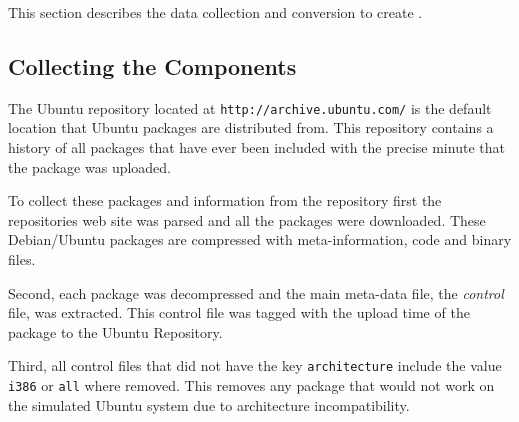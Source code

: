 This section describes the data collection and conversion to create \usermodel.

\subsection{Collecting the Components}
The Ubuntu repository located at \texttt{http://archive.ubuntu.com/} is the default location that Ubuntu packages are distributed from.
This repository contains a history of all packages that have ever been included with the precise minute that the package was uploaded.

To collect these packages and information from the repository first the repositories web site was parsed and all the packages were downloaded.
These Debian/Ubuntu packages are compressed with meta-information, code and binary files.

Second, each package was decompressed and the main meta-data file, the \textit{control} file, was extracted.
This control file was tagged with the upload time of the package to the Ubuntu Repository.

Third, all control files that did not have the key \verb+architecture+  include the value \verb+i386+ or \verb+all+ where removed.
This removes any package that would not work on the simulated Ubuntu system due to architecture incompatibility.


